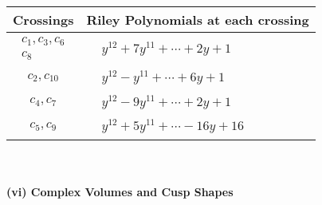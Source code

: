 \documentclass[1p]{elsarticle_modified}
\theoremstyle{definition}
\begin{document}
\begin{tabular}{m{50pt}|m{274pt}}
Crossings & \hspace{64pt}Riley Polynomials at each crossing \\
\hline $$\begin{aligned}c_{1},c_{3},c_{6}\\c_{8}\end{aligned}$$&$\begin{aligned}
&y^{12}+7 y^{11}+\cdots+2 y+1
\end{aligned}$\\
\hline $$\begin{aligned}c_{2},c_{10}\end{aligned}$$&$\begin{aligned}
&y^{12}- y^{11}+\cdots+6 y+1
\end{aligned}$\\
\hline $$\begin{aligned}c_{4},c_{7}\end{aligned}$$&$\begin{aligned}
&y^{12}-9 y^{11}+\cdots+2 y+1
\end{aligned}$\\
\hline $$\begin{aligned}c_{5},c_{9}\end{aligned}$$&$\begin{aligned}
&y^{12}+5 y^{11}+\cdots-16 y+16
\end{aligned}$\\
\hline
\end{tabular}\\~\\
\newpage\flushleft \textbf{(vi) Complex Volumes and Cusp Shapes}
\end{document}
